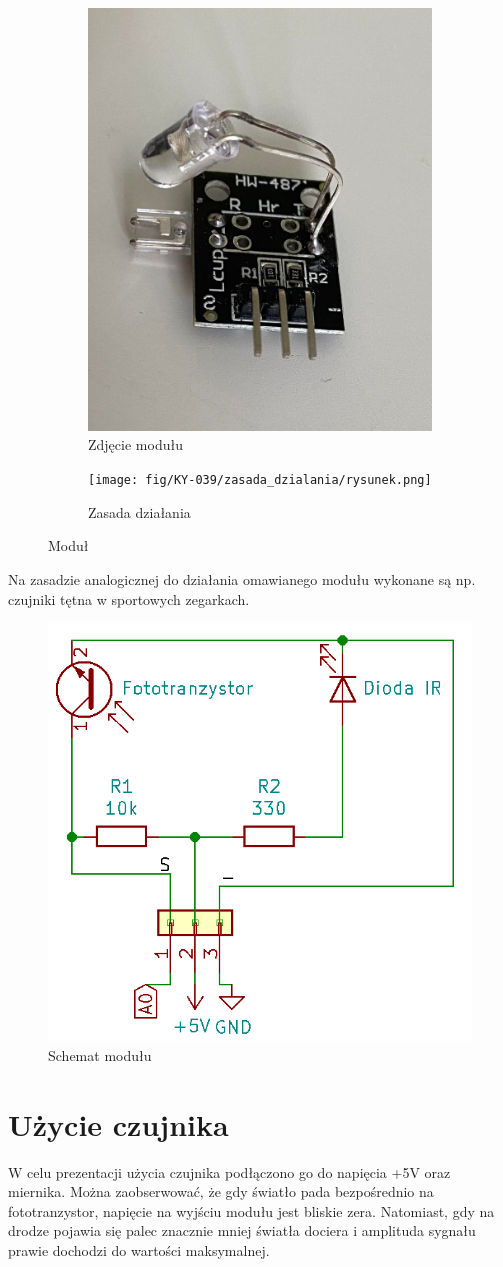 \documentclass[11pt, a4paper]{article}
\begin{document}
\vspace{0.5cm}
\begin{figure}[h]
\centering
\begin{subfigure}{.4\textwidth}
  \centering
  \includegraphics[width=.4\linewidth]{fig/KY-039/zdj_modułu/zdj2.jpg}
  \caption{Zdjęcie modułu}
  \label{fig:sub1}
\end{subfigure}%
\begin{subfigure}{.4\textwidth}
  \centering
    \texttt{[image: fig/KY-039/zasada\_dzialania/rysunek.png]}
      \caption{Zasada działania}
  \label{zd}
\end{subfigure}
\caption{Moduł}
\label{fig:test}
\end{figure}
\vspace{0.5cm}
Na zasadzie analogicznej do działania omawianego modułu wykonane są np. czujniki tętna w sportowych zegarkach. 


\vspace{0.5cm}
\begin{figure}[h]
  \centering
  \includegraphics[width=.5\textwidth]{fig/KY-039/polaczenie_modulu/modul_sch.png}
    \caption{Schemat modułu}
    \label{sch}
\end{figure}


\section{Użycie czujnika}
W celu prezentacji użycia czujnika podłączono go do napięcia +5V oraz miernika. Można zaobserwować, że gdy światło pada bezpośrednio na fototranzystor, napięcie na wyjściu modułu jest bliskie zera. Natomiast, gdy na drodze pojawia się palec znacznie mniej światła dociera i amplituda sygnału prawie dochodzi do wartości maksymalnej. 
\end{document}
